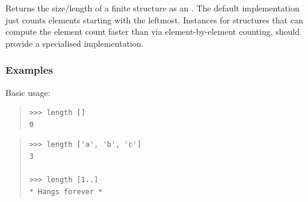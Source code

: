 \begin{haddockdesc}
\item[\begin{tabular}{@{}l}
length :: Foldable t => t a -> Int
\end{tabular}]
{\haddockbegindoc
Returns the size/length of a finite structure as an .  The
 default implementation just counts elements starting with the leftmost.
 Instances for structures that can compute the element count faster
 than via element-by-element counting, should provide a specialised
 implementation.\par
\subsubsection*{\textbf{Examples}}
Basic usage:\par
\begin{quote}
{\haddockverb\begin{verbatim}
>>> length []
0

\end{verbatim}}
\end{quote}
\begin{quote}
{\haddockverb\begin{verbatim}
>>> length ['a', 'b', 'c']
3

>>> length [1..]
* Hangs forever *

\end{verbatim}}
\end{quote}}
\end{haddockdesc}
